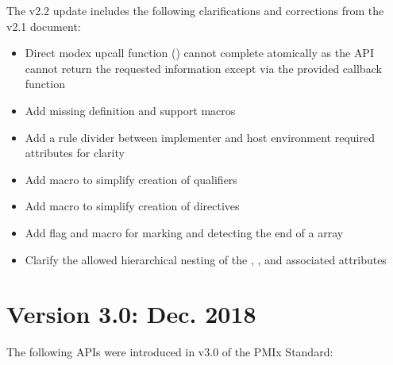The v2.2 update includes the following clarifications and corrections from the v2.1 document:

\begin{itemize}
    \item Direct modex upcall function () cannot complete atomically as the \ac{API} cannot return the requested information except via the provided callback function
    \item Add missing  definition and support macros
    \item Add a rule divider between implementer and host environment required attributes for clarity
    \item Add  macro to simplify creation of  qualifiers
    \item Add  macro to simplify creation of  directives
    \item Add flag and  macro for marking and detecting the end of a  array
    \item Clarify the allowed hierarchical nesting of the , , and associated attributes
\end{itemize}

\section{Version 3.0: Dec. 2018}

The following \acp{API} were introduced in v3.0 of the PMIx Standard:

